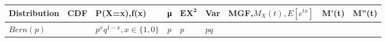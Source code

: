 \documentclass[]{tufte-book}
\begin{document}
\begin{longtable}[]{@{}lllllllll@{}}
\toprule
\begin{minipage}[b]{0.08\columnwidth}\raggedright
Distribution\strut
\end{minipage} & \begin{minipage}[b]{0.08\columnwidth}\raggedright
CDF\strut
\end{minipage} & \begin{minipage}[b]{0.08\columnwidth}\raggedright
P(X=x),f(x)\strut
\end{minipage} & \begin{minipage}[b]{0.08\columnwidth}\raggedright
μ\strut
\end{minipage} & \begin{minipage}[b]{0.08\columnwidth}\raggedright
\(\mathbf{EX^2}\)\strut
\end{minipage} & \begin{minipage}[b]{0.08\columnwidth}\raggedright
Var\strut
\end{minipage} & \begin{minipage}[b]{0.08\columnwidth}\raggedright
MGF,\(M_X(t),E[e^{tx}]\)\strut
\end{minipage} & \begin{minipage}[b]{0.08\columnwidth}\raggedright
M'(t)\strut
\end{minipage} & \begin{minipage}[b]{0.08\columnwidth}\raggedright
M''(t)\strut
\end{minipage}\tabularnewline
\midrule
\endhead
\begin{minipage}[t]{0.08\columnwidth}\raggedright
\(Bern(p)\)\strut
\end{minipage} & \begin{minipage}[t]{0.08\columnwidth}\raggedright
\strut
\end{minipage} & \begin{minipage}[t]{0.08\columnwidth}\raggedright
\(p^xq^{1-x},x\in\{1,0\}\)\strut
\end{minipage} & \begin{minipage}[t]{0.08\columnwidth}\raggedright
\(p\)\strut
\end{minipage} & \begin{minipage}[t]{0.08\columnwidth}\raggedright
\(p\)\strut
\end{minipage} & \begin{minipage}[t]{0.08\columnwidth}\raggedright
\(pq\)\strut
\end{minipage} & \begin{minipage}[t]{0.08\columnwidth}\raggedright

\end{minipage}
\end{longtable}
\end{document}
